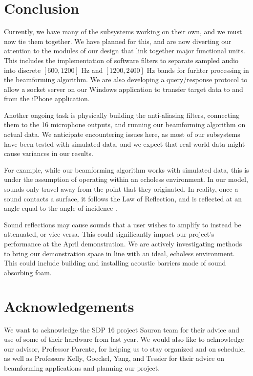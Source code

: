 \documentclass[10pt,journal,compsoc]{IEEEtran}
\begin{document}
\section{Conclusion}

Currently, we have many of the subsystems working on their own, and we must now tie them together. We have planned for this, and are now diverting our attention to the modules of our design that link together major functional units. This includes the implementation of software filters to separate sampled audio into discrete $[600, 1200]$ Hz and $[1200, 2400]$ Hz bands for furhter processing in the beamforming algorithm. We are also developing a query/response protocol to allow a socket server on our Windows application to transfer target data to and from the iPhone application.


Another ongoing task is physically building the anti-aliasing filters, connecting them to the 16 microphone outputs, and running our beamforming algorithm on actual data. We anticipate encountering issues here, as most of our subsystems have been tested with simulated data, and we expect that real-world data might cause variances in our results.

For example, while our beamforming algorithm works with simulated data, this is under the assumption of operating within an echoless environment. In our model, sounds only travel away from the point that they originated. In reality, once a sound contacts a surface, it follows the Law of Reflection, and is reflected at an angle equal to the angle of incidence \cite{hyperphysics}.

Sound reflections may cause sounds that a user wishes to amplify to instead be attenuated, or vice versa. This could significantly impact our project's performance at the April demonstration. We are actively investigating methods to bring our demonstration space in line with an ideal, echoless environment. This could include building and installing acoustic barriers made of sound absorbing foam.

\section{Acknowledgements}
We want to acknowledge the SDP 16 project Sauron team for their advice and use of some of their hardware from last year. We would also like to acknowledge our advisor, Professor Parente, for helping us to stay organized and on schedule, as well as Professors Kelly, Goeckel, Yang, and Tessier for their advice
on beamforming applications and planning our project.
\end{document}

